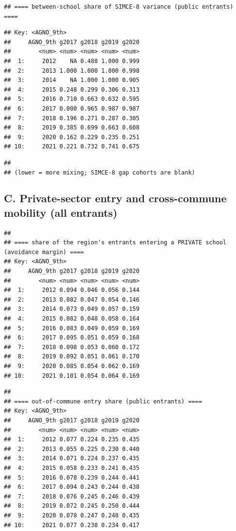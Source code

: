 \documentclass[
]{article}
\begin{document}
\begin{verbatim}
## ==== between-school share of SIMCE-8 variance (public entrants) ====
\end{verbatim}

\begin{verbatim}
## Key: <AGNO_9th>
##     AGNO_9th g2017 g2018 g2019 g2020
##        <num> <num> <num> <num> <num>
##  1:     2012    NA 0.488 1.000 0.999
##  2:     2013 1.000 1.000 1.000 0.998
##  3:     2014    NA 1.000 1.000 0.905
##  4:     2015 0.248 0.299 0.306 0.313
##  5:     2016 0.710 0.663 0.632 0.595
##  6:     2017 0.000 0.965 0.987 0.987
##  7:     2018 0.196 0.271 0.287 0.305
##  8:     2019 0.385 0.699 0.663 0.608
##  9:     2020 0.162 0.229 0.235 0.251
## 10:     2021 0.221 0.732 0.741 0.675
\end{verbatim}

\begin{verbatim}
## 
## (lower = more mixing; SIMCE-8 gap cohorts are blank)
\end{verbatim}

\hypertarget{c.-private-sector-entry-and-cross-commune-mobility-all-entrants}{%
\subsection{C. Private-sector entry and cross-commune mobility (all
entrants)}\label{c.-private-sector-entry-and-cross-commune-mobility-all-entrants}}

\begin{verbatim}
## 
## ==== share of the region's entrants entering a PRIVATE school (avoidance margin) ====
## Key: <AGNO_9th>
##     AGNO_9th g2017 g2018 g2019 g2020
##        <num> <num> <num> <num> <num>
##  1:     2012 0.094 0.046 0.056 0.144
##  2:     2013 0.082 0.047 0.054 0.146
##  3:     2014 0.073 0.049 0.057 0.159
##  4:     2015 0.082 0.048 0.058 0.164
##  5:     2016 0.083 0.049 0.059 0.169
##  6:     2017 0.095 0.051 0.059 0.168
##  7:     2018 0.098 0.053 0.060 0.172
##  8:     2019 0.092 0.051 0.061 0.170
##  9:     2020 0.085 0.054 0.062 0.169
## 10:     2021 0.101 0.054 0.064 0.169
\end{verbatim}

\begin{verbatim}
## 
## ==== out-of-commune entry share (public entrants) ====
## Key: <AGNO_9th>
##     AGNO_9th g2017 g2018 g2019 g2020
##        <num> <num> <num> <num> <num>
##  1:     2012 0.077 0.224 0.235 0.435
##  2:     2013 0.055 0.225 0.230 0.440
##  3:     2014 0.071 0.224 0.237 0.435
##  4:     2015 0.058 0.233 0.241 0.435
##  5:     2016 0.078 0.239 0.244 0.441
##  6:     2017 0.094 0.243 0.244 0.438
##  7:     2018 0.076 0.245 0.246 0.439
##  8:     2019 0.072 0.245 0.250 0.444
##  9:     2020 0.078 0.247 0.248 0.435
## 10:     2021 0.077 0.238 0.234 0.417
\end{verbatim}
\end{document}
